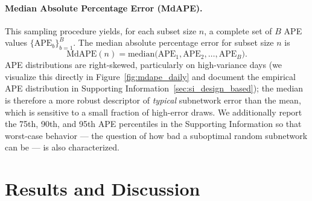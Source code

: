 \documentclass[12pt]{article}
\theoremstyle{remark}
\begin{document}
\paragraph{Median Absolute Percentage Error (MdAPE).}\label{sec:MAPE}
This sampling procedure yields, for each subset size $n$, a complete set of $B$ APE values $\{\mathrm{APE}_b\}_{b=1}^{B}$. The median absolute percentage error for subset size $n$ is
\begin{equation}\label{eq:mape}
  \mathrm{MdAPE}(n) = \text{median}\big(\mathrm{APE}_1, \mathrm{APE}_2, \dots, \mathrm{APE}_B\big).
\end{equation}
APE distributions are right-skewed, particularly on high-variance days (we visualize this directly in Figure~\ref{fig:mdape_daily} and document the empirical APE distribution in Supporting Information~\ref{sec:si_design_based}); the median is therefore a more robust descriptor of \emph{typical} subnetwork error than the mean, which is sensitive to a small fraction of high-error draws. We additionally report the 75th, 90th, and 95th APE percentiles in the Supporting Information so that worst-case behavior --- the question of how bad a suboptimal random subnetwork can be --- is also characterized.

\section*{Results and Discussion} \label{sec:results}
\setcounter{section}{3}
\setcounter{subsection}{0}
\end{document}
